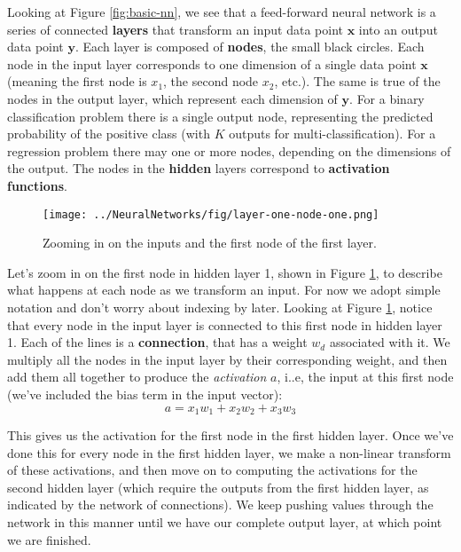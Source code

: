 Looking at Figure \ref{fig:basic-nn}, we see that a feed-forward neural network is a series of connected \textbf{layers} that transform an input data point $\textbf{x}$ into an output data point $\textbf{y}$. Each layer is composed of \textbf{nodes}, the small black circles. Each node in the input layer corresponds to one dimension of a single data point $\textbf{x}$ (meaning the first node is $x_1$, the second node $x_2$, etc.). The same is true of the nodes in the output layer, which represent each dimension of $\textbf{y}$.  For a binary classification problem there is a single output node, representing the predicted probability of the positive class (with $K$ outputs for multi-classification). For a regression problem there may one or more nodes, depending on the dimensions of the output.  The nodes in the  \textbf{hidden} layers correspond to  \textbf{activation functions}.

\begin{figure}
    \centering
    \texttt{[image: ../NeuralNetworks/fig/layer-one-node-one.png]}
    \caption{Zooming in on the inputs and the first node of the first layer.}
    \label{fig:layer-one-node-one}
\end{figure}

 Let's zoom in on the first node in hidden layer 1, shown in Figure \ref{fig:layer-one-node-one}, to describe what happens at each node as we transform an input. For now we adopt simple notation and don't worry about indexing by later.
Looking at Figure \ref{fig:layer-one-node-one}, notice that every node in the input layer is connected to this first node in hidden layer 1. Each of the lines is a \textbf{connection}, that has a weight $w_{d}$ associated with it. We multiply all the nodes in the input layer by their corresponding weight, and then add them all together to produce the {\em activation} $a$, i..e,  the input at this first node (we've included the bias term in the input vector):
\begin{equation}
	a = x_{1} w_{1} + x_{2} w_{2} + x_{3} w_{3}
\end{equation}

This gives us the activation for the first node in the first hidden layer. Once we've done this for every node in the first hidden layer, we make a non-linear transform of these activations, and then move on to computing the activations for the second hidden layer (which require the outputs from the first hidden layer, as indicated by the network of connections). We keep pushing values through the network in this manner until we have our complete output layer, at which point we are finished.

